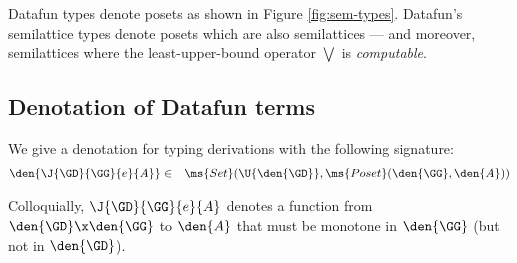 Datafun types denote posets as shown in Figure \ref{fig:sem-types}. Datafun's
semilattice types denote posets which are also semilattices --- and moreover,
semilattices where the least-upper-bound operator $\bigvee$ is
\emph{computable}.  

\subsection{Denotation of Datafun terms}

We give a denotation for typing derivations with the following signature:
\begin{eqnarray*}
  \den{\J{\GD}{\GG}{e}{A}} &\in&
  \ms{Set}(\U{\den{\GD}}, \ms{Poset}(\den{\GG}, \den{A}))
\end{eqnarray*}

Colloquially, $\J{\GD}{\GG}{e}{A}$ denotes a function from $\den{\GD} \x
\den{\GG}$ to $\den{A}$ that must be monotone in $\den{\GG}$ (but not in
$\den{\GD}$).
